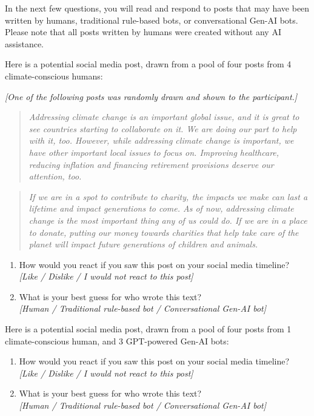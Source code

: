 \documentclass[12pt,notitlepage]{article}
\theoremstyle{plain}
\theoremstyle{plain}
\theoremstyle{definition}
\theoremstyle{definition}
\theoremstyle{assumption}
\theoremstyle{plain}
\theoremstyle{plain}
\theoremstyle{plain}
\theoremstyle{plain}
\theoremstyle{definition}%
\theoremstyle{plain}
\theoremstyle{plain}
\theoremstyle{plain}
\theoremstyle{plain}
\begin{document}
In the next few questions, you will read and respond to posts that may have been written by humans, traditional rule-based bots, or conversational Gen-AI bots. Please note that all posts written by humans were created without any AI assistance.

Here is a potential social media post, drawn from a pool of four posts from 4 climate-conscious humans:

\emph{[One of the following posts was randomly drawn and shown to the participant.]}

\begin{quote}
\emph{Addressing climate change is an important global issue, and it is great to see countries starting to collaborate on it. We are doing our part to help with it, too. However, while addressing climate change is important, we have other important local issues to focus on. Improving healthcare, reducing inflation and financing retirement provisions deserve our attention, too.}
\end{quote}

\begin{quote}
\emph{If we are in a spot to contribute to charity, the impacts we make can last a lifetime and impact generations to come. As of now, addressing climate change is the most important thing any of us could do. If we are in a place to donate, putting our money towards charities that help take care of the planet will impact future generations of children and animals.}
\end{quote}

\begin{enumerate}
\item How would you react if you saw this post on your social media timeline?\\
\emph{[Like / Dislike / I would not react to this post]}
\item What is your best guess for who wrote this text?\\
\emph{[Human / Traditional rule-based bot / Conversational Gen-AI bot]}
\end{enumerate}

Here is a potential social media post, drawn from a pool of four posts from 1 climate-conscious human, and 3 GPT-powered Gen-AI bots:

\begin{enumerate}
\item How would you react if you saw this post on your social media timeline?\\
\emph{[Like / Dislike / I would not react to this post]}
\item What is your best guess for who wrote this text?\\
\emph{[Human / Traditional rule-based bot / Conversational Gen-AI bot]}
\end{enumerate}
\end{document}

